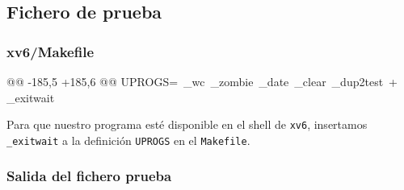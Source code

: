 \subsection{Fichero de prueba}
\subsubsection{xv6/Makefile}
\begin{listing}
@@ -185,5 +185,6 @@ UPROGS=\
    _wc\
    _zombie\
    _date\
    _clear\
    _dup2test\
+   _exitwait\
\end{listing}
\par Para que nuestro programa esté disponible en el shell de \texttt{xv6}, insertamos 
\texttt{\_exitwait} a la definición \texttt{UPROGS} en el \texttt{Makefile}.

\newpage
\subsubsection{Salida del fichero prueba}
